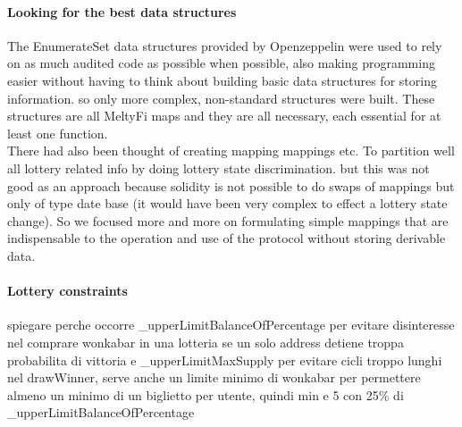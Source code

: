 \paragraph{Looking for the best data structures}
The EnumerateSet data structures provided by Openzeppelin were used to rely on as much audited code as possible when possible, also making programming easier without having to think about building basic data structures for storing information. so only more complex, non-standard structures were built. These structures are all MeltyFi maps and they are all necessary, each essential for at least one function. 
\\
\indent There had also been thought of creating mapping mappings etc. To partition well all lottery related info by doing lottery state discrimination. but this was not good as an approach because solidity is not possible to do swaps of mappings but only of type date base (it would have been very complex to effect a lottery state change). So we focused more and more on formulating simple mappings that are indispensable to the operation and use of the protocol without storing derivable data. 

\paragraph{Lottery constraints}

spiegare perche occorre \_upperLimitBalanceOfPercentage per evitare disinteresse nel comprare wonkabar in una lotteria se un solo address detiene troppa probabilita di vittoria e \_upperLimitMaxSupply per evitare cicli troppo lunghi nel drawWinner, serve anche un limite minimo di wonkabar per permettere almeno un minimo di un biglietto per utente, quindi min e 5 con 25\% di \_upperLimitBalanceOfPercentage

